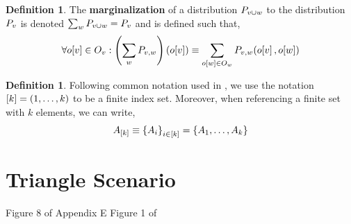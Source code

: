 \documentclass[aps, 10pt, english, twoside, pra, nofootinbib, longbibliography]{revtex4-1}
\theoremstyle{plain}
\theoremstyle{definition}
\newtheorem{definition}[theorem]{Definition}
\theoremstyle{remark}
\newcommand{\term}[1]{\textcolor{Mahogany}{\textbf{#1}}}
\newcommand{\outc}[1]{o\!\bs{#1}} %
\begin{document}
    \begin{definition}
        The \term{marginalization} of a distribution $\prob[v \cup w]$ to the distribution $\prob[v]$ is denoted $\sum_{w} \prob[v \cup w] = \prob[v]$ and is defined such that,
        \[ \forall \outc{v} \in O_v : \br{\sum_{w} \prob[v, w]}\br{\outc{v}} \defined \sum_{o\bs{w} \in O_w} \prob[v, w][\outc{v}, \outc{w}] \]
    \end{definition}

    \begin{definition}
        Following common notation used in \cite{Fritz_2011}, we use the notation $\left[ k \right] = \left( 1, \ldots, k \right)$ to be a finite index set. Moreover, when referencing a finite set with $k$ elements, we can write,
        \[ A_{\left[ k \right]} \equiv \left\{ A_i \right\}_{i \in \left[ k \right]} = \left\{ A_1, \ldots, A_k \right\} \]
    \end{definition}


    \section{Triangle Scenario}

    Figure 8 of Appendix E \cite{Henson_2014}
    Figure 1 of \cite{Inflation}
\end{document}

